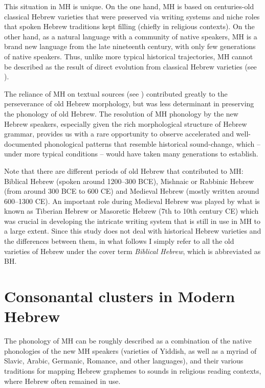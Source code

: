 This situation in MH is unique. On the one hand, MH is based on centuries-old classical Hebrew varieties that were preserved via writing systems and niche roles that spoken Hebrew traditions kept filling (chiefly in religious contexts). On the other hand, as a natural language with a community of native speakers, MH is a brand new language from the late nineteenth century, with only few generations of native speakers. Thus, unlike more typical historical trajectories, MH cannot be described as the result of direct evolution from classical Hebrew varieties (see \citealt{blanc1957hebrewsk, fellman1973concerningsk, morag1959plannedsk}).

The reliance of MH on textual sources (see \citealt{myhill2004parameterized}) contributed greatly to the perseverance of old Hebrew morphology, but was less determinant in preserving the phonology of old Hebrew.
The resolution of MH phonology by the new Hebrew speakers, especially given the rich morphological structure of Hebrew grammar, provides us with a rare opportunity to observe accelerated and well-documented phonological patterns that resemble historical sound-change, which -- under more typical conditions -- would have taken many generations to establish.

Note that there are different periods of old Hebrew that contributed to MH: Biblical Hebrew (spoken around 1200--300 BCE), Mishnaic or Rabbinic Hebrew (from around 300 BCE to 600 CE) and Medieval Hebrew (mostly written around 600--1300 CE).
An important role during Medieval Hebrew was played by what is known as Tiberian Hebrew or Masoretic Hebrew (7th to 10th century CE) which was crucial in developing the intricate writing system that is still in use in MH to a large extent.
Since this study does not deal with historical Hebrew varieties and the differences between them, in what follows I simply refer to all the old varieties of Hebrew under the cover term \emph{Biblical Hebrew}, which is abbreviated as BH.

\section{Consonantal clusters in Modern Hebrew}\label{sec:mhphon}

The phonology of MH can be roughly described as a combination of the native phonologies of the new MH speakers (varieties of Yiddish, as well as a myriad of Slavic, Arabic, Germanic, Romance, and other languages), and their various traditions for mapping Hebrew graphemes to sounds in religious reading contexts, where Hebrew often remained in use.

